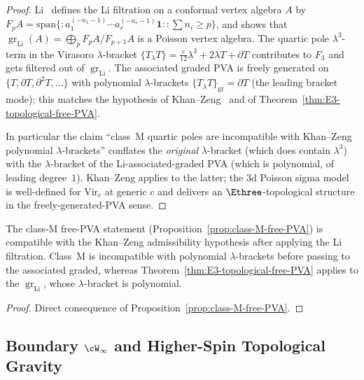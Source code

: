 \begin{proof}
Li~\textup{\cite{Li-filtration}} defines the Li filtration on a conformal
vertex algebra $A$ by $F_p A = \mathrm{span}\{ :a_1^{(-n_1-1)}\cdots
a_r^{(-n_r-1)}\mathbf{1}: : \sum n_i \ge p\}$, and shows that
$\operatorname{gr}_{\mathrm{Li}}(A) = \bigoplus_p F_p A / F_{p+1} A$ is a
Poisson vertex algebra. The quartic pole $\lambda^3$-term in the Virasoro
$\lambda$-bracket $\{T_\lambda T\} = \tfrac{c}{12} \lambda^3 + 2\lambda T
+ \partial T$ contributes to $F_3$ and gets filtered out of
$\operatorname{gr}_{\mathrm{Li}}$. The associated graded PVA is freely
generated on $\{T, \partial T, \partial^2 T, \ldots\}$ with polynomial
$\lambda$-brackets $\{T_\lambda T\}_{\mathrm{gr}} = \partial T$
(the leading bracket mode); this matches the hypothesis of
Khan--Zeng~\cite{Khan-Zeng} and of
Theorem~\ref{thm:E3-topological-free-PVA}.

In particular the claim ``class~M quartic poles are incompatible with
Khan--Zeng polynomial $\lambda$-brackets'' conflates the
\emph{original} $\lambda$-bracket (which does contain $\lambda^3$) with
the $\lambda$-bracket of the Li-associated-graded PVA (which is
polynomial, of leading degree~$1$). Khan--Zeng applies to the latter;
the $3$d Poisson sigma model is well-defined for $\mathrm{Vir}_c$ at
generic $c$ and delivers an $\Ethree$-topological structure in the
freely-generated-PVA sense.
\end{proof}

\begin{proposition}
\label{prop:stage-9-class-M-kz-admissibility}
The class-M free-PVA statement
(Proposition~\ref{prop:class-M-free-PVA}) is compatible with the
Khan--Zeng admissibility hypothesis after applying the Li filtration.
Class~M is incompatible with polynomial $\lambda$-brackets before
passing to the associated graded, whereas
Theorem~\ref{thm:E3-topological-free-PVA} applies to the
$\operatorname{gr}_{\mathrm{Li}}$, whose $\lambda$-bracket is polynomial.
\end{proposition}

\begin{proof}
Direct consequence of Proposition~\ref{prop:class-M-free-PVA}.
\end{proof}

\subsection{Boundary \texorpdfstring{$\cW_\infty$}{W-infinity} and Higher-Spin Topological Gravity}
\label{subsec:climax-restatement}

